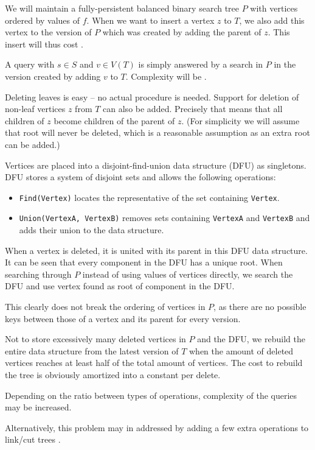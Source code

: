 We will maintain a fully-persistent balanced binary search tree $P$ with vertices ordered by values of $f$. When we want to insert a vertex $z$ to $T$, we also add this vertex to the version of $P$ which was created by adding the parent of $z$. This insert will thus cost .

A query with $s \in S$ and $v \in V(T)$ is simply answered by a search in $P$ in the version created by adding $v$ to $T$. Complexity will be .

Deleting leaves is easy -- no actual procedure is needed. Support for deletion of non-leaf vertices $z$ from $T$ can also be added. Precisely that means that all children of $z$ become children of the parent of $z$. (For simplicity we will assume that root will never be deleted, which is a reasonable assumption as an extra root can be added.) 

Vertices are placed into a disjoint-find-union data structure (DFU) \cite{dfu} as singletons. DFU stores a system of disjoint sets and allows the following operations:

\begin{itemize}
\item {\tt Find(Vertex)} locates the representative of the set containing {\tt Vertex}.
\item {\tt Union(VertexA, VertexB)} removes sets containing {\tt VertexA} and {\tt VertexB} and adds their union to the data structure.
\end{itemize}

When a vertex is deleted, it is united with its parent in this DFU data structure. It can be seen that every component in the DFU has a unique root. When searching through $P$ instead of using values of vertices directly, we search the DFU and use vertex found as root of component in the DFU.

This clearly does not break the ordering of vertices in $P$, as there are no possible keys between those of a vertex and its parent for every version. 
 
Not to store excessively many deleted vertices in $P$ and the DFU, we rebuild the entire data structure from the latest version of $T$ when the amount of deleted vertices reaches at least half of the total amount of vertices. The cost to rebuild the tree is obviously amortized into a constant per delete.
 
Depending on the ratio between types of operations, complexity of the queries may be increased. %

Alternatively, this problem may in addressed by adding a few extra operations to link/cut trees \cite{link-cut}.